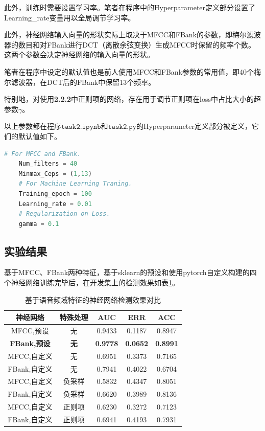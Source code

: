 \documentclass[a4paper]{article}
\begin{document}
    此外，训练时需要设置学习率。笔者在程序中的Hyperparameter定义部分设置了Learning\_rate变量用以全局调节学习率。
    
    此外，神经网络输入向量的形状实际上取决于MFCC和FBank的参数，即梅尔滤波器的数目和对FBank进行DCT（离散余弦变换）生成MFCC时保留的频率个数。这两个参数会决定神经网络的输入向量的形状。
    
    笔者在程序中设定的默认值也是前人使用MFCC和FBank参数的常用值，即40个梅尔滤波器，在DCT后的FBank中保留13个频率。
    
    特别地，对使用\textbf{2.2.2}中正则项的网络，存在用于调节正则项在loss中占比大小的超参数$\gamma$。
    
    以上参数都在程序$\mathtt{task2.ipynb}$和$\mathtt{task2.py}$的Hyperparameter定义部分被定义，它们的默认值如下。
    
    \begin{lstlisting}[language=python]
    # For MFCC and FBank.
    Num_filters = 40
    Minmax_Ceps = (1,13)
    # For Machine Learning Traning.
    Training_epoch = 100
    Learning_rate = 0.01
    # Regularization on Loss.
    gamma = 0.1
\end{lstlisting}
    
    

\subsection{实验结果}

基于MFCC、FBank两种特征，基于sklearn的预设和使用pytorch自定义构建的四个神经网络训练完毕后，在开发集上的检测效果如表\ref{tab4}。

\begin{table}[th]
  \centering
  \begin{tabular}{ c c c c c }
    \toprule
    \textbf{神经网络} & \textbf{特殊处理} & \textbf{AUC} & \textbf{ERR} & \textbf{ACC}\\
    \midrule
    MFCC,预设 & 无 & 0.9433 & 0.1187 & 0.8947\\
    \textbf{FBank,预设} & \textbf{无} & \textbf{0.9778} & \textbf{0.0652} & \textbf{0.8991}\\
    \midrule
    MFCC,自定义 & 无 & 0.6951 & 0.3373 & 0.7165\\
    FBank,自定义 & 无 & 0.7941 & 0.4022 & 0.6704\\
    \midrule
    MFCC,自定义 & 负采样 & 0.5832 & 0.4347 & 0.8051\\
    FBank,自定义 & 负采样 & 0.6620 & 0.3989 & 0.8136\\
    \midrule
    MFCC,自定义 & 正则项 & 0.6230 & 0.3272 & 0.7123\\
    FBank,自定义 & 正则项 & 0.6941 & 0.4193 & 0.7931\\
    \bottomrule
  \end{tabular}
  \vspace{0.5em}
  \centering \caption{基于语音频域特征的神经网络检测效果对比}
  \label{tab4}
\end{table}
\end{document}
